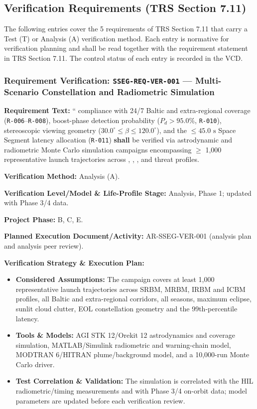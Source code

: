\subsection{Verification Requirements (TRS Section 7.11)}
The following entries cover the 5 requirements of TRS Section 7.11 that carry a Test (T) or Analysis (A) verification method. Each entry is normative for verification planning and shall be read together with the requirement statement in TRS Section 7.11. The control status of each entry is recorded in the VCD.
\subsubsection{Requirement Verification: \texttt{SSEG-REQ-VER-001} --- Multi-Scenario Constellation and Radiometric Simulation}
\label{ver:SSEG-REQ-VER-001}
\textbf{Requirement Text:} `` compliance with 24/7 Baltic and extra-regional coverage (\texttt{R-006}--\texttt{R-008}), boost-phase detection probability ($P_d > 95.0\%$, \texttt{R-010}), stereoscopic viewing geometry ($30.0^\circ \le \beta \le 120.0^\circ$), and the $\le 45.0\text{ s}$ Space Segment latency allocation (\texttt{R-011}) \textbf{shall} be verified via astrodynamic and radiometric Monte Carlo simulation campaigns encompassing $\ge$ 1,000 representative launch trajectories across , , , and  threat profiles.
\par\textbf{Verification Method:} Analysis (A).
\par\textbf{Verification Level/Model \& Life-Profile Stage:} Analysis, Phase 1; updated with Phase 3/4 data.
\par\textbf{Project Phase:} B, C, E.
\par\textbf{Planned Execution Document/Activity:} AR-SSEG-VER-001 (analysis plan and analysis peer review).
\par\textbf{Verification Strategy \& Execution Plan:}
\begin{itemize}
\item \textbf{Considered Assumptions:} The campaign covers at least 1,000 representative launch trajectories across SRBM, MRBM, IRBM and ICBM profiles, all Baltic and extra-regional corridors, all seasons, maximum eclipse, sunlit cloud clutter, EOL constellation geometry and the 99th-percentile latency.
\item \textbf{Tools \& Models:} AGI STK 12/Orekit 12 astrodynamics and coverage simulation, MATLAB/Simulink radiometric and warning-chain model, MODTRAN 6/HITRAN plume/background model, and a 10,000-run Monte Carlo driver.
\item \textbf{Test Correlation \& Validation:} The simulation is correlated with the HIL radiometric/timing measurements and with Phase 3/4 on-orbit data; model parameters are updated before each verification review.
\end{itemize}
